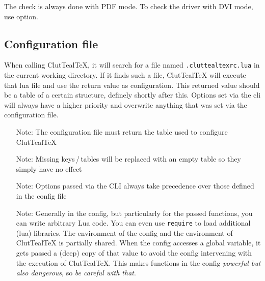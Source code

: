 \documentclass[a4paper, 11pt]{scrartcl}
\let\TeXold\TeX
\newcommand\CluttealTeX{ClutTeal\TeX\xspace}
\renewcommand\TeX{\TeXold\xspace}
\begin{document}
The check is always done with PDF mode.
To check the driver with DVI mode, use  option.

\subsection{Configuration file} \label{sec:config-file}
When calling \CluttealTeX, it will search for a file named \texttt{.cluttealtexrc.lua} in the current working directory.
If it finds such a file, \CluttealTeX will execute that lua file and use the return value as configuration.
This returned value should be a table of a certain structure, definely shortly after this.
Options set via the cli will always have a higher priority and overwrite anything that was set via the configuration file.

\begin{itemize}
	\item[Note:] The configuration file must return the table used to configure \CluttealTeX
	\item[Note:] Missing keys\,/\,tables will be replaced with an empty table so they simply have no effect
	\item[Note:] Options passed via the CLI always take precedence over those defined in the config file
	\item[Note:]
		Generally in the config, but particularly for the passed functions, you can write arbitrary Lua code.
		You can even use \texttt{require} to load additional (lua) libraries.
		The environment of the config and the environment of \CluttealTeX is partially shared.
		When the config accesses a global variable, it gets passed a (deep) copy of that value to avoid the config intervening with the execution of \CluttealTeX.
		This makes functions in the config \emph{powerful but also dangerous}, so \emph{be careful with that}.
\end{itemize}
\end{document}
